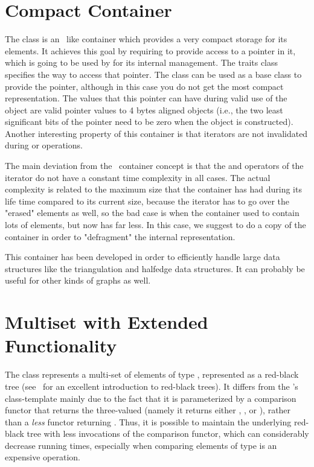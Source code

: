 \section{Compact Container}
The class  is an \stl\ like container
which provides a very compact storage for its elements.  It achieves this goal
by requiring  to provide access to a pointer in it, which is going to be
used by  for its internal management.
The traits class  specifies the way to
access that pointer.  The class  can be
used as a base class to provide the pointer, although in this case you do not
get the most compact representation.  The values that this pointer can have
during valid use of the object are valid pointer values to 4 bytes aligned
objects (i.e., the two least significant bits of the pointer need to be zero
when the object is constructed). Another interesting property of this
container is that iterators are not invalidated during  or
 operations.

The main deviation from the \stl\ container concept is that the \ccc{++} and
\ccc{--} operators of the iterator do not have a constant time complexity in
all cases.  The actual complexity is related to the maximum size that the
container has had during its life time compared to its current size, because
the iterator has to go over the "erased" elements as well, so the bad case is
when the container used to contain lots of elements, but now has far less.  In
this case, we suggest to do a copy of the container in order to "defragment"
the internal representation.

This container has been developed in order to efficiently handle large data
structures like the triangulation and halfedge data structures.  It can
probably be useful for other kinds of graphs as well.

\section{Multiset with Extended Functionality}

The class  represents a
multi-set of elements of type , represented as a red-black tree
(see~\cite[Chapter~13]{clrs-ia-01} for an excellent introduction to red-black
trees). It differs from the \stl's  class-template mainly due
to the fact that it is parameterized by a comparison functor 
that returns the three-valued  (namely it returns
either , , or ), rather than a {\em less}
functor returning . Thus, it is possible to maintain
the underlying red-black tree with less invocations of the comparison functor,
which can considerably decrease running times, especially when comparing
elements of type  is an expensive operation.

